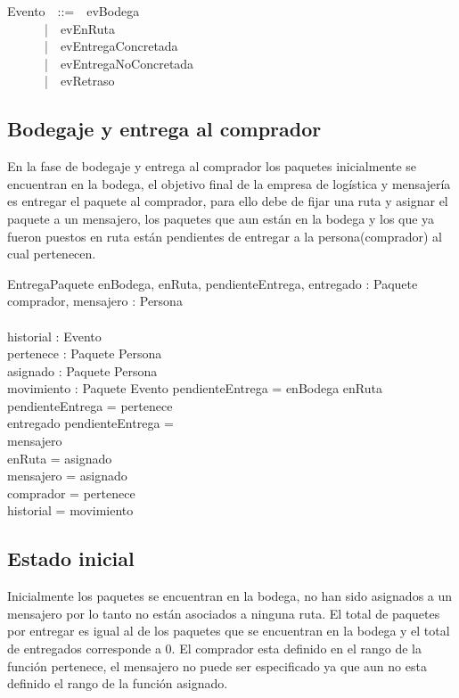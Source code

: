 \documentclass[12pt,a4paper]{article}
\begin{document}
\begin{zed}
Evento~~::=~~evBodega\\
~~~~~~|~~evEnRuta\\
~~~~~~|~~evEntregaConcretada\\
~~~~~~|~~evEntregaNoConcretada\\
~~~~~~|~~evRetraso\\
\end{zed}

\subsection{Bodegaje y entrega al comprador}

En la fase de bodegaje y entrega al comprador los paquetes inicialmente se encuentran en la bodega, el objetivo final de la empresa de logística y mensajería es entregar el paquete al comprador, para ello debe de fijar una ruta y asignar el paquete a un mensajero, los paquetes que aun están en la bodega y los que ya fueron puestos en ruta están pendientes de entregar a la persona(comprador) al cual pertenecen.

\begin{schema}{EntregaPaquete}
enBodega, enRuta, pendienteEntrega, entregado : \power Paquete\\
comprador, mensajero : \power Persona\\\\
historial : \power Evento\\
pertenece : Paquete \pfun Persona\\
asignado : Paquete \pfun Persona\\
movimiento : Paquete \pfun Evento
\where
pendienteEntrega = enBodega \cup enRuta \\
pendienteEntrega = \dom pertenece \\
entregado \cap pendienteEntrega = \emptyset \\
mensajero \neq \emptyset \\
enRuta = \dom asignado\\
mensajero = \ran asignado\\
comprador = \ran pertenece\\
historial = \ran movimiento
\end{schema}

\subsection{Estado inicial}

Inicialmente los paquetes se encuentran en la bodega, no han sido asignados a un mensajero por lo tanto no están asociados a ninguna ruta. El total de paquetes por entregar es igual al de los paquetes que se encuentran en la bodega y el total de entregados corresponde a 0. El comprador esta definido en el rango de la función pertenece, el mensajero no puede ser especificado ya que aun no esta definido el rango de la función asignado.
\end{document}

